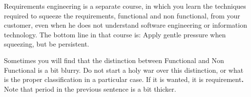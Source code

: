 \documentclass[\docroot/main]{subfiles}
\begin{document}
Requirements engineering is a separate course, in which you learn the
techniques required to squeeze the requirements, functional and non
functional, from your customer, even when he does not understand
software engineering or information technology. The bottom line in
that course is: Apply gentle pressure when squeezing, but be persistent.

Sometimes you will find that the distinction between Functional and
Non Functional is a bit blurry. Do not start a holy war over this
distinction, or what is the proper classification in a particular
case. If it is wanted, it is requirement\textbf{.} Note that  period in
the previous sentence is a bit thicker.
\end{document}
